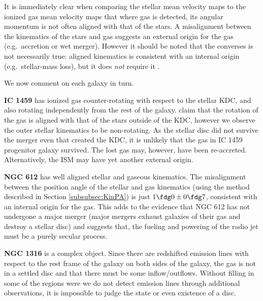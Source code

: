 \documentclass[a4paper,fleqn,usenatbib]{mnras}
\begin{document}
		It is immediately clear when comparing the stellar mean velocity maps to the ionized gas mean velocity maps that where gas is detected, its angular momentum is not often aligned with that of the stars. A misalignment between the kinematics of the stars and gas suggests an external origin for the gas (e.g.\ accretion or wet merger). However it should be noted that the converses is not necessarily true: aligned kinematics is consistent with an internal origin (e.g.\ stellar-mass loss), but it does \emph{not} require it \citep[e.g.][]{Davis2011a}. 

		We now comment on each galaxy in turn.

		\textbf{IC 1459} has ionized gas counter-rotating with respect to the stellar KDC, and also rotating independently from the rest of the galaxy. \citet{Franx1988} claim that the rotation of the gas is aligned with that of the stars outside of the KDC, however we observe the outer stellar kinematics to be non-rotating. As the stellar disc did not survive the merger even that created the KDC, it is unlikely that the gas in IC 1459 progenitor galaxy survived. The lost gas may, however, have been re-accreted. Alternatively, the ISM may have yet another external origin. 

		\textbf{NGC 612} has well aligned stellar and gaseous kinematics. The misalignment between the position angle of the stellar and gas kinematics (using the method described in Section \ref{subsubsec:KinPA}) is just $1\fdg0\pm0\fdg7$, consistent with an internal origin for the gas. This adds to the evidence that NGC 612 has not undergone a major merger (major mergers exhaust galaxies of their gas and destroy a stellar disc) and suggests that, the fueling and powering of the radio jet must be a purely secular process. 


		\textbf{NGC 1316} is a complex object. Since there are redshifted emission lines with respect to the rest frame of the galaxy on both sides of the galaxy, the gas is not in a settled disc and that there must be some inflow/outflows. 
		Without filling in some of the regions were we do not detect emission lines through additional observations, it is impossible to judge the state or even existence of a disc. 
\end{document}
